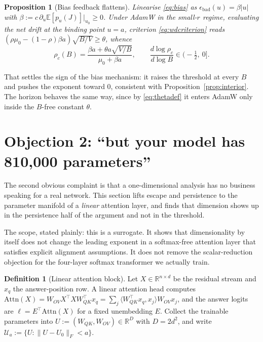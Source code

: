 \documentclass{article}
\theoremstyle{plain}
\newtheorem{proposition}{Proposition}
\theoremstyle{definition}
\newtheorem{definition}{Definition}
\theoremstyle{remark}
\newcommand{\E}{\mathbb{E}}
\newcommand{\R}{\mathbb{R}}
\newcommand{\1}{\mathbf{1}}
\newcommand{\cU}{\mathcal{U}}
\newcommand{\bad}{\mathrm{bad}}
\begin{document}
\begin{proposition}[Bias feedback flattens]
\label{prop:biasflat}
Linearise \eqref{eq:bias} as $\epsilon_\bad(u) = \beta|u|$ with
$\beta := c\,\partial_u\E[p_u(J)]|_{u_0}\ge0$. Under AdamW in the small-$r$
regime, evaluating the net drift at the binding point $u = a$, criterion
\eqref{eq:wdcriterion} reads $(\rho\mu_0-(1-\rho)\beta a)\sqrt{B/V}\ge\theta$,
whence
\begin{equation}
\label{eq:biasflat}
\rho_c(B) = \frac{\beta a + \theta a\sqrt{V/B}}{\mu_0 + \beta a},
\qquad
\frac{d\log\rho_c}{d\log B}\in\Big(-\tfrac12,\ 0\Big].
\end{equation}
\end{proposition}

That settles the sign of the bias mechanism: it raises the threshold at every $B$
and pushes the exponent toward $0$, consistent with
Proposition~\ref{prop:interior}. The horizon behaves the same way, since by
\eqref{eq:thetadef} it enters AdamW only inside the $B$-free constant $\theta$.

\section{Objection 2: ``but your model has 810{,}000 parameters''}
\label{sec:matrix}

The second obvious complaint is that a one-dimensional analysis has no business
speaking for a real network. This section lifts escape and persistence to the
parameter manifold of a \emph{linear} attention layer, and finds that dimension
shows up in the persistence half of the argument and not in the threshold.

The scope, stated plainly: this is a surrogate. It shows that dimensionality by
itself does not change the leading exponent in a softmax-free attention layer
that satisfies explicit alignment assumptions. It does not remove the
scalar-reduction objection for the four-layer softmax transformer we actually
train.

\begin{definition}[Linear attention block]
\label{def:linattn}
Let $X\in\R^{n\times d}$ be the residual stream and $x_q$ the answer-position
row. A linear attention head computes
$\mathrm{Attn}(X) = W_{OV}X^\top XW_{QK}^\top x_q
= \sum_j\langle W_{QK}^\top x_q, x_j\rangle W_{OV}x_j$, and the answer logits are
$\ell = E^\top\mathrm{Attn}(X)$ for a fixed unembedding $E$. Collect the
trainable parameters into $U := (W_{QK},W_{OV})\in\R^D$ with $D = 2d^2$, and
write $\cU_a := \{U : \|U-U_0\|_F < a\}$.
\end{definition}
\end{document}
